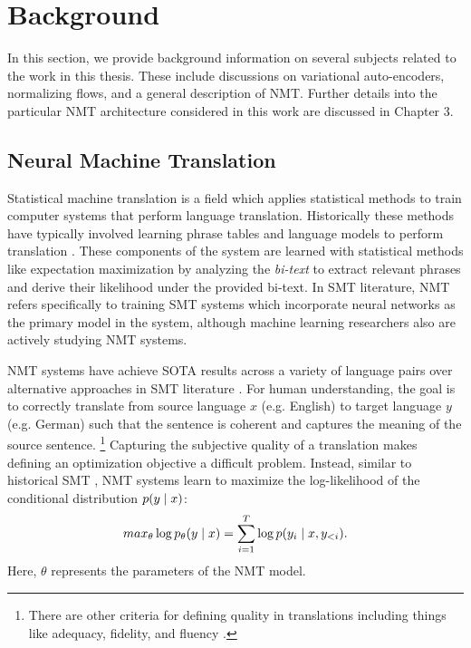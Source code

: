 \chapter{Background}
\label{ch:background}
In this section, we provide background information on several subjects related to the work in this thesis. These include discussions on variational auto-encoders, normalizing flows, and a general description of \ac{NMT}. Further details into the particular \ac{NMT} architecture considered in this work are discussed in Chapter 3. %



\section{Neural Machine Translation}
\label{section:neuralMT}

Statistical machine translation is a field which applies statistical methods to train computer systems that perform language translation. Historically these methods have typically involved learning phrase tables and language models to perform translation \cite{koehnSMT2010}. These components of the system are learned with statistical methods like expectation maximization by analyzing the \textit{bi-text} to extract relevant phrases and derive their likelihood under the provided bi-text.  In \ac{SMT} literature, \ac{NMT} refers specifically to training \ac{SMT} systems which incorporate neural networks as the primary model in the system, although machine learning researchers also are actively studying \ac{NMT} systems. 

\ac{NMT} systems have achieve \ac{SOTA} results across a variety of language pairs over alternative approaches in \ac{SMT} literature \cite{bahdanau2014NMTBYJoint,koehn2017NMT,vaswani2017attentionTransformer}. For human understanding, the goal is to correctly translate from source language $x$ (e.g. English) to target language $y$ (e.g. German) such that the sentence is coherent and captures the meaning of the source sentence. \footnote{There are other criteria for defining quality in translations including things like adequacy, fidelity, and fluency \cite{Papineni2002BLEU}.} Capturing the subjective quality of a translation makes defining an optimization  objective a difficult problem. Instead, similar to historical \ac{SMT} , \ac{NMT} systems learn to maximize the log-likelihood of the conditional distribution $p(y\; | \;{x})$: 
\begin{equation}
	max_{\theta} \log p_{\theta}(y \; | \;{x})  = \sum_{i=1}^{T} \log p(y_{i} \; | \;{x, y_{<i}}).
\end{equation}
Here, $\theta$ represents the parameters of the \ac{NMT} model. 

